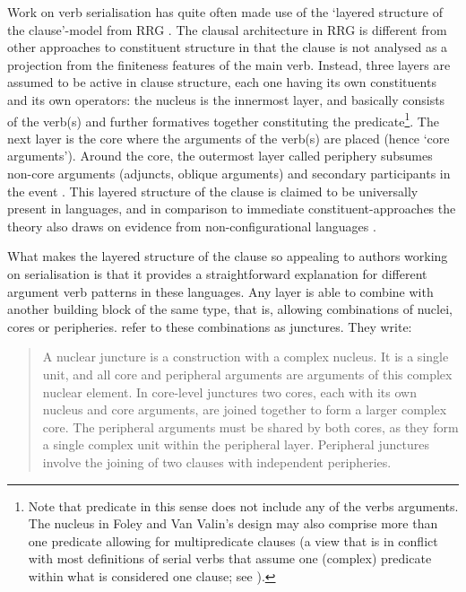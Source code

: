 Work on verb serialisation has quite often made use of the `layered structure of the clause'-model from RRG \citep{olson1981barai, foley1984functional, van1997syntax}. The clausal architecture in RRG is different from other approaches to constituent structure in that the clause is not analysed as a projection from the finiteness features of the main verb. Instead, three layers are assumed to be active in clause structure, each one having its own constituents and its own operators: the nucleus is the innermost layer, and basically consists of the verb(s) and further formatives together constituting the predicate\footnote{Note that predicate in this sense does not include any of the verbs arguments. The nucleus in Foley and Van Valin's design may also comprise more than one predicate allowing for multipredicate clauses (a view that is in conflict with most definitions of serial verbs that assume one (complex) predicate within what is considered one clause; see \citealt[77]{foley1984functional}).}. The next layer is the core where the arguments of the verb(s) are placed (hence `core arguments'). Around the core, the outermost layer called periphery subsumes non-core arguments (adjuncts, oblique arguments) and secondary participants in the event \citep[77]{foley1984functional}. This layered structure of the clause is claimed to be universally present in languages, and in comparison to immediate constituent-approaches the theory also draws on evidence from non-configurational languages \citep[78]{foley1984functional}.

What makes the layered structure of the clause so appealing to authors working on serialisation is that it provides a straightforward explanation for different argument verb patterns in these languages. Any layer is able to combine with another building block of the same type, that is, allowing combinations of nuclei, cores or peripheries. \citet[188]{foley1984functional} refer to these combinations as junctures. They write:

\begin{quote}A nuclear juncture is a construction with a complex nucleus. It is a single unit, and all core and peripheral arguments are arguments of this complex nuclear element. In core-level junctures two cores, each with its own nucleus and core arguments, are joined together to form a larger complex core. The peripheral arguments must be shared by both cores, as they form a single complex unit within the peripheral layer. Peripheral junctures involve the joining of two clauses with independent peripheries.\end{quote}

